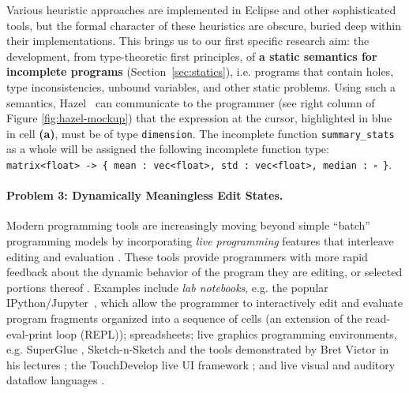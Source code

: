 \documentclass[letterpaper,USenglish]{lipics-v2016}
\let\li\lstinline
\newcommand{\Hazel}[0]{\textsf{Hazel}}
\newcommand{\HazelEnv}[0]{\Hazel}
\begin{document}
Various heuristic
approaches are implemented in Eclipse and other sophisticated tools, but the 
formal character of these heuristics are obscure, buried deep within their implementations. This brings us to our first specific research aim: the 
development, from type-theoretic first principles, of \textbf{a static semantics for incomplete programs} (Section~\ref{sec:statics}),
i.e. programs that contain holes, type inconsistencies, unbound variables, and
other static problems. Using such a semantics, \HazelEnv~ can 
communicate to the programmer (see right column of Figure \ref{fig:hazel-mockup}) that the expression at the cursor, highlighted in blue in cell \textbf{(a)}, must be of type \li{dimension}. The incomplete function
\li{summary_stats} as a whole will be assigned the following incomplete function
type: \texttt{matrix<float> -> \{ {mean} : vec<float>, std : vec<float>, median :~$\square$ \}}.

\paragraph{Problem 3: Dynamically Meaningless Edit States.} Modern programming
tools are increasingly moving beyond simple ``batch'' programming models by
incorporating \emph{live programming} features that interleave editing and
evaluation \cite{DBLP:conf/icse/Tanimoto13,DBLP:journals/vlc/Tanimoto90,McDirmid:2007:LUL:1297105.1297073}. These tools provide programmers with more rapid feedback about the
dynamic behavior of the program they are editing, or selected portions thereof \cite{McDirmid:2013:ULP:2509578.2509585}. Examples include \emph{lab notebooks},
e.g. the popular IPython/Jupyter~\cite{Perez:2007:ISI:1251563.1251831}, which allow the
programmer to interactively edit and evaluate program fragments organized into a
sequence of cells (an extension of the read-eval-print loop (REPL)); spreadsheets; {live graphics programming environments}, e.g. SuperGlue \cite{McDirmid:2007:LUL:1297105.1297073}, Sketch-n-Sketch \cite{DBLP:conf/pldi/ChughHSA16,DBLP:conf/icse/Chugh25} and the tools demonstrated by Bret Victor in his lectures \cite{victor2012inventing}; the TouchDevelop live UI framework \cite{burckhardt2013s}; and live visual and auditory dataflow languages \cite{DBLP:conf/vl/BurnettAW98}. 
\end{document}
